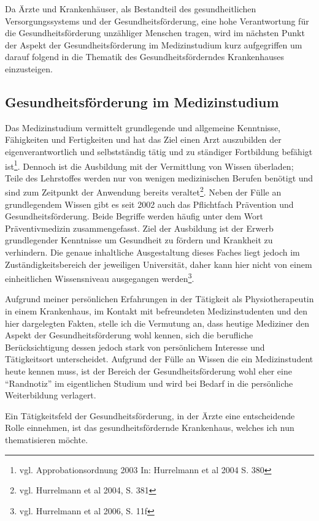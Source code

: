 Da Ärzte und Krankenhäuser, als Bestandteil des gesundheitlichen Versorgungssystems und der Gesundheitsförderung, eine hohe Verantwortung für die Gesundheitsförderung unzähliger Menschen tragen, wird im nächsten Punkt der Aspekt der Gesundheitsförderung im Medizinstudium kurz aufgegriffen um darauf folgend in die Thematik des Gesundheitsförderndes Krankenhauses einzusteigen.

\subsection{Gesundheitsförderung im Medizinstudium}
\label{sec:GesundheitsförderungImMedizinstudium}

Das Medizinstudium vermittelt grundlegende und allgemeine Kenntnisse, Fähigkeiten und Fertigkeiten und hat das Ziel einen Arzt auszubilden der eigenverantwortlich und selbstständig tätig und zu ständiger Fortbildung befähigt ist\footnote{vgl. Approbationsordnung 2003 In: Hurrelmann et al 2004 S. 380}. Dennoch ist die Ausbildung mit der Vermittlung von Wissen überladen; Teile des Lehrstoffes werden nur von wenigen medizinischen Berufen benötigt und sind zum Zeitpunkt der Anwendung bereits veraltet\footnote{vgl. Hurrelmann et al 2004, S. 381}. Neben der Fülle an grundlegendem Wissen gibt es seit 2002 auch das Pflichtfach Prävention und Gesundheitsförderung. Beide Begriffe werden häufig unter dem Wort Präventivmedizin zusammengefasst. Ziel der Ausbildung ist der Erwerb grundlegender Kenntnisse um Gesundheit zu fördern und Krankheit zu verhindern. Die genaue inhaltliche Ausgestaltung dieses Faches liegt jedoch im Zuständigkeitsbereich der jeweiligen Universität, daher kann hier nicht von einem einheitlichen Wissensniveau ausgegangen werden\footnote{vgl. Hurrelmann et al 2006, S. 11f}. 

Aufgrund meiner persönlichen Erfahrungen in der Tätigkeit als Physiotherapeutin in einem Krankenhaus, im Kontakt mit befreundeten Medizinstudenten und den hier dargelegten Fakten, stelle ich die Vermutung an, dass heutige Mediziner den Aspekt der Gesundheitsförderung wohl kennen, sich die berufliche Berücksichtigung dessen jedoch stark von persönlichem Interesse und Tätigkeitsort unterscheidet. Aufgrund der Fülle an Wissen die ein Medizinstudent heute kennen muss, ist der Bereich der Gesundheitsförderung wohl eher eine "`Randnotiz"' im eigentlichen Studium und wird bei Bedarf in die persönliche Weiterbildung verlagert. 

Ein Tätigkeitsfeld der Gesundheitsförderung, in der Ärzte eine entscheidende Rolle einnehmen, ist das gesundheitsfördernde Krankenhaus, welches ich nun thematisieren möchte.


